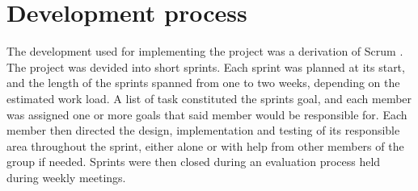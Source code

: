 \section{Development process}


The development used for implementing the project was a derivation of Scrum \cite{Scrum}. The project
was devided into short sprints. Each sprint was planned at its start, and the length of
the sprints spanned from one to two weeks, depending on the estimated work load. A list
of task constituted the sprints goal, and each member was assigned one or more goals
that said member would be responsible for. Each member then directed the design,
implementation and testing of its responsible area throughout the sprint, either alone or
with help from other members of the group if needed. Sprints were then closed during an
evaluation process held during weekly meetings.
